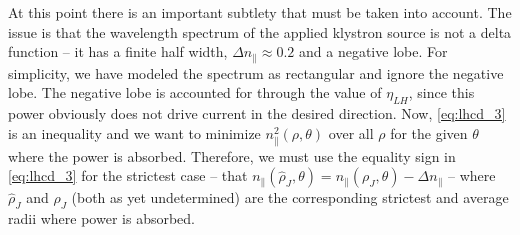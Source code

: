 At this point there is an important subtlety that must be taken into account. The issue is that the wavelength spectrum of the applied klystron source is not a delta function -- it has a finite half width, $\Delta n _ { \| } \approx 0.2$ and a negative lobe. For simplicity, we have modeled the spectrum as rectangular and ignore the negative lobe. The negative lobe is accounted for through the value of $\eta_{LH}$, since this power obviously does not drive current in the desired direction. Now, \cref{eq:lhcd_3} is an inequality and we want to minimize $n_\parallel^2 (\rho,\theta)$ over all $\rho$ for the given $\theta$ where the power is absorbed. Therefore, we must use the equality sign in \cref{eq:lhcd_3} for the strictest case -- that $n _ { \| } \left( \hat { \rho } _ { J } , \theta \right) = n _ { \| } \left( \rho _ { J } , \theta \right) - \Delta n _ { \| }$ -- where $\hat \rho_J$ and $\rho_J$ (both as yet undetermined) are the corresponding strictest and average radii where power is absorbed.

